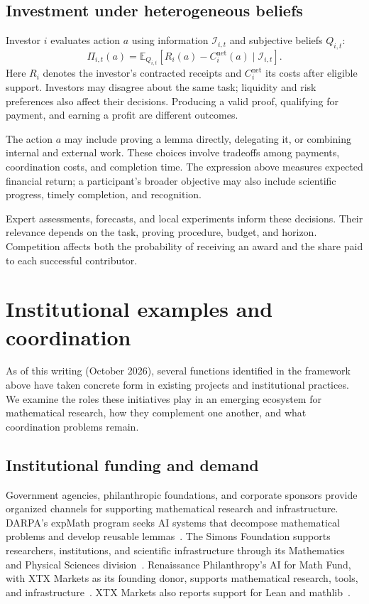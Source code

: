 \documentclass[11pt,a4paper,reqno]{amsart}
\numberwithin{equation}{section}
\begin{document}
\subsection{Investment under heterogeneous beliefs}
Investor $i$ evaluates action $a$ using information $\mathcal I_{i,t}$ and subjective beliefs $Q_{i,t}$:
\begin{equation}
\label{eq:expected-return}
 \Pi_{i,t}(a)=\mathbb E_{Q_{i,t}}\!\left[
 R_i(a)-C_i^{\mathrm{net}}(a)\mid\mathcal I_{i,t}\right].
\end{equation}
Here $R_i$ denotes the investor's contracted receipts and $C_i^{\mathrm{net}}$ its costs after eligible support. Investors may disagree about the same task; liquidity and risk preferences also affect their decisions. Producing a valid proof, qualifying for payment, and earning a profit are different outcomes.

The action \(a\) may include proving a lemma directly, delegating it, or combining internal and external work. These choices involve tradeoffs among payments, coordination costs, and completion time. The expression above measures expected financial return; a participant's broader objective may also include scientific progress, timely completion, and recognition.

Expert assessments, forecasts, and local experiments inform these decisions. Their relevance depends on the task, proving procedure, budget, and horizon. Competition affects both the probability of receiving an award and the share paid to each successful contributor.

\section{Institutional examples and coordination}
\label{sec:examples}

As of this writing (October 2026), several functions identified in the framework above have taken concrete form in existing projects and institutional practices. We examine the roles these initiatives play in an emerging ecosystem for mathematical research, how they complement one another, and what coordination problems remain.

\subsection{Institutional funding and demand}
Government agencies, philanthropic foundations, and corporate sponsors provide organized channels for supporting mathematical research and infrastructure. DARPA's expMath program seeks AI systems that decompose mathematical problems and develop reusable lemmas~\cite{darpa}. The Simons Foundation supports researchers, institutions, and scientific infrastructure through its Mathematics and Physical Sciences division~\cite{simons}. Renaissance Philanthropy's AI for Math Fund, with XTX Markets as its founding donor, supports mathematical research, tools, and infrastructure~\cite{renaissance}. XTX Markets also reports support for Lean and mathlib~\cite{xtx}.
\end{document}
